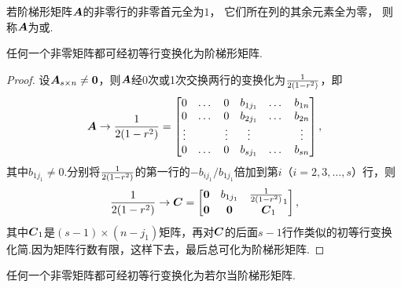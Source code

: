 \begin{definition}
若阶梯形矩阵\(\boldsymbol{A}\)的非零行的非零首元全为\(1\)，%
它们所在列的其余元素全为零，%
则称\(\boldsymbol{A}\)为或.
\end{definition}

\begin{lemma}
任何一个非零矩阵都可经初等行变换化为阶梯形矩阵.
\begin{proof}
设\(\boldsymbol{A}_{s \times n} \neq \boldsymbol{0}\)，则\(\boldsymbol{A}\)经0次或1次交换两行的变换化为\(\frac{1}{2(1-r^2)}\)，即\[
\boldsymbol{A} \to \frac{1}{2(1-r^2)} = \begin{bmatrix}
0 & \dots & 0 & b_{1 j_1} & \dots & b_{1n} \\
0 & \dots & 0 & b_{2 j_1} & \dots & b_{2n} \\
\vdots & & \vdots & \vdots & & \vdots \\
0 & \dots & 0 & b_{s j_1} & \dots & b_{sn}
\end{bmatrix},
\]其中\(b_{1 j_1} \neq 0\).分别将\(\frac{1}{2(1-r^2)}\)的第一行的\(-b_{i j_1}/b_{1 j_1}\)倍加到第\(i\)（\(i=2,3,\dotsc,s\)）行，则\[
\frac{1}{2(1-r^2)} \to \boldsymbol{C} = \begin{bmatrix}
\boldsymbol{0} & b_{1 j_1} & \frac{1}{2(1-r^2)}_1 \\
\boldsymbol{0} & \boldsymbol{0} & \boldsymbol{C}_1
\end{bmatrix},
\]其中\(\boldsymbol{C}_1\)是\((s-1)\times(n-j_1)\)矩阵，再对\(\boldsymbol{C}\)的后面\(s-1\)行作类似的初等行变换化简.因为矩阵行数有限，这样下去，最后总可化为阶梯形矩阵.
\end{proof}
\end{lemma}

\begin{corollary}\label{theorem:线性方程组.非零矩阵可经初等行变换化为若尔当阶梯形矩阵}
任何一个非零矩阵都可经初等行变换化为若尔当阶梯形矩阵.
\end{corollary}

